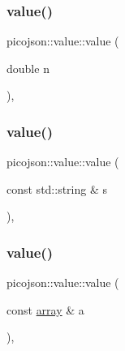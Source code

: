 \subsubsection{\texorpdfstring{value()}{value()}\hspace{0.1cm}{\footnotesize\ttfamily [4/10]}}
{\footnotesize\ttfamily picojson\+::value\+::value (\begin{DoxyParamCaption}\item[{double}]{n }\end{DoxyParamCaption})\hspace{0.3cm}{\ttfamily [inline]}, {\ttfamily [explicit]}}

\hypertarget{classpicojson_1_1value_aa4841f2dd8deeaffca7a225075b88da9}{}\label{classpicojson_1_1value_aa4841f2dd8deeaffca7a225075b88da9} 
\subsubsection{\texorpdfstring{value()}{value()}\hspace{0.1cm}{\footnotesize\ttfamily [5/10]}}
{\footnotesize\ttfamily picojson\+::value\+::value (\begin{DoxyParamCaption}\item[{const std\+::string \&}]{s }\end{DoxyParamCaption})\hspace{0.3cm}{\ttfamily [inline]}, {\ttfamily [explicit]}}

\hypertarget{classpicojson_1_1value_a729e8f01d9bb4686daac82d0d3295afe}{}\label{classpicojson_1_1value_a729e8f01d9bb4686daac82d0d3295afe} 
\subsubsection{\texorpdfstring{value()}{value()}\hspace{0.1cm}{\footnotesize\ttfamily [6/10]}}
{\footnotesize\ttfamily picojson\+::value\+::value (\begin{DoxyParamCaption}\item[{const \hyperlink{classpicojson_1_1value_adeff4fdf7ee5675eeb7686bb89233c43}{array} \&}]{a }\end{DoxyParamCaption})\hspace{0.3cm}{\ttfamily [inline]}, {\ttfamily [explicit]}}

